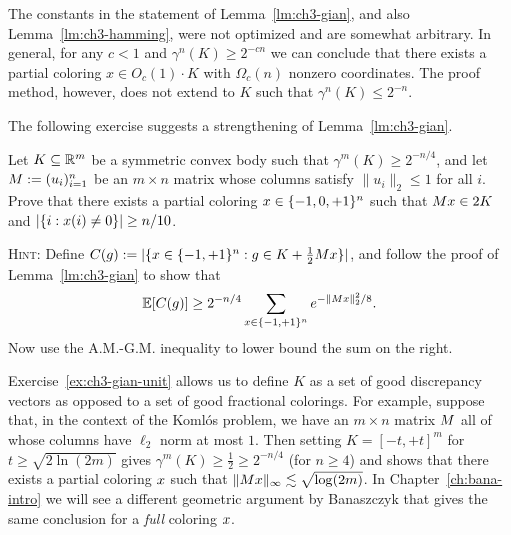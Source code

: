 \begin{remark}
  The constants in the statement of Lemma~\ref{lm:ch3-gian}, and also Lemma~\ref{lm:ch3-hamming}, 
were not optimized and are somewhat arbitrary.  In general, for any $c<1$ and $\gamma^n(K) \ge 2^{-cn}$ we can conclude
that there exists a partial coloring $x \in O_c(1) \cdot K$ with $\Omega_c(n)$ nonzero coordinates. 
The proof method, however, does
not extend to $K$ such that $\gamma^n(K) \le 2^{-n}$. 
\end{remark}

The following exercise suggests a strengthening of
Lemma~\ref{lm:ch3-gian}.
\begin{exercise}\label{ex:ch3-gian-unit}
  Let $K \subseteq \mathbb{R}^m$ be a symmetric convex body such that
  \(\gamma^m(K) \ge 2^{-n/4}\), and let \(M := (u_i)_{i =
    1}^n\) be an \(m\times n\) matrix whose columns satisfy
  \(\|u_i\|_2 \le 1\) for all \(i\).  Prove that there  exists a
  partial coloring \(x \in \{-1, 0, +1\}^n\) such that \(M x
  \in 2 K\) and \(|\{i: x(i) \neq 0\}| \ge n/10\).
\smallskip 

  \textsc{Hint:} Define $C(g) := |\{x \in \{-1,+1\}^n: g \in K +
  \frac12 Mx\}|$, and follow the proof of
  Lemma~\ref{lm:ch3-gian} to show that
  \[
    \mathbb{E}[C(g)] \ge 2^{-n/4}\sum_{x \in \{-1,+1\}^n} e^{-\|Mx\|_2^2/8}.
  \]
  Now use the A.M.-G.M. inequality to lower bound the sum on
  the right. 
\end{exercise}

  Exercise~\ref{ex:ch3-gian-unit} allows us to define $K$ as a set of
good discrepancy vectors as opposed to a set of good fractional
colorings. For example, suppose that, in the context of the Koml\'os
problem, we have an $m \times n$ matrix $M$ all of whose columns
have $\ell_2$ norm at most $1$. Then setting $K = [-t,+t]^m$ for $t \ge \sqrt{2\ln(2m)}$ gives $\gamma^m(K) \ge \frac12 \ge
2^{-n/4}$ (for $n \ge 4$) and shows that there exists a partial
coloring $x$ such that $\|Mx\|_\infty \lesssim
\sqrt{\log(2m)}$. In Chapter~\ref{ch:bana-intro} we will see a
different geometric argument by Banaszczyk that gives the same
conclusion for a \emph{full} coloring $x$.

